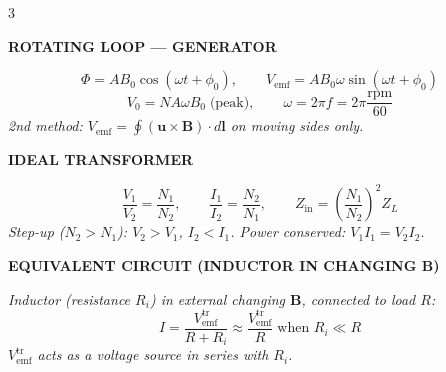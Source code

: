 \documentclass[6pt,letterpaper]{article}
\newcommand{\shead}[3]{%
  \noindent\colorbox{#1}{\parbox{\dimexpr\linewidth-2\fboxsep\relax}%
  {\color{#2}\bfseries\fontsize{6}{7}\selectfont #3}}\vspace{0.5pt}}
\begin{document}
\begin{multicols}{3}
\vspace{0.3pt}
\shead{amberbg}{amber}{ROTATING LOOP — GENERATOR}
\begin{ebox}
\[\Phi=AB_0\cos(\omega t+\phi_0),\qquad V_\text{emf}=AB_0\omega\sin(\omega t+\phi_0)\]
\[V_0=NA\omega B_0\;\text{(peak)},\qquad\omega=2\pi f=2\pi\frac{\text{rpm}}{60}\]
\textit{2nd method: $V_\text{emf}=\oint(\mathbf{u}\times\mathbf{B})\cdot d\mathbf{l}$ on moving sides only.}
\end{ebox}

\vspace{0.3pt}
\shead{tealbg}{teal}{IDEAL TRANSFORMER}
\begin{ebox}
\[\frac{V_1}{V_2}=\frac{N_1}{N_2},\qquad\frac{I_1}{I_2}=\frac{N_2}{N_1},\qquad Z_\text{in}=\!\left(\!\frac{N_1}{N_2}\!\right)^{\!2}\!Z_L\]
\textit{Step-up ($N_2>N_1$): $V_2>V_1$, $I_2<I_1$. Power conserved: $V_1I_1=V_2I_2$.}
\end{ebox}

\vspace{0.3pt}
\shead{tealbg}{teal}{EQUIVALENT CIRCUIT (INDUCTOR IN CHANGING $\mathbf{B}$)}
\begin{ebox}
\textit{Inductor (resistance $R_i$) in external changing $\mathbf{B}$, connected to load $R$:}
\[I=\frac{V_\text{emf}^\text{tr}}{R+R_i}\approx\frac{V_\text{emf}^\text{tr}}{R}\;\text{when } R_i\ll R\]
\textit{$V_\text{emf}^\text{tr}$ acts as a voltage source in series with $R_i$.}
\end{ebox}

\end{multicols}
\end{document}
